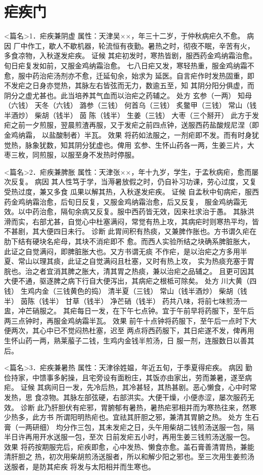 \documentclass[a4paper,12pt,UTF8,twoside]{ctexbook}
\begin{document}
\chapter{疟疾门}
<篇名>1．疟疾兼阴虚
属性：天津吴××，年三十二岁，于仲秋病疟久不愈。 
病因 厂中作工，歇人不歇机器，轮流恒有夜勤。暑热之时，彻夜不眠，辛苦有火，多食凉物，入秋遂发疟疾。 
证候 其疟初发时，寒热皆剧，服西药金鸡纳霜治愈。旬日疟复发如前，又服金鸡纳霜治愈。 
七八日疟又发，寒轻热重，服金鸡纳霜不愈，服中药治疟汤剂亦不愈，迁延旬余，始求为 
延医。自言疟作时发热固重，即不发疟之日身亦觉热，其脉左右皆弦而无力，数逾五至，知 
其阴分阳分俱虚，而阴分之虚尤甚也。此当培养其气血而以治疟之药辅之。 
处方 玄参（一两） 知母（六钱） 天冬（六钱） 潞参（三钱） 
何首乌（三钱） 炙鳖甲（三钱） 常山（钱半酒炒） 柴胡（钱半） 茵 
陈（钱半） 生姜（三钱） 大枣（三个掰开） 
此方于发疟之前一夕煎服，翌晨煎渣再服，又于发疟之前四点钟，送服西药盐酸规尼涅（即金鸡纳霜， 
以盐酸制者）半瓦。 
效果 将药如法服之，一剂疟即不发。而有时身犹觉热，脉象犹数，知其阴分犹虚也。俾用 
玄参、生怀山药各一两，生姜三片，大枣三枚，同煎服，以服至身不发热时停服。 


<篇名>2．疟疾兼脾胀
属性：天津张××，年十九岁，学生，于孟秋病疟，愈而屡次反复。 
病因 其人性笃于学，当溽暑放假之时，仍自补习功课，劳心过度，又复受热过度，兼又多食 
瓜果以解其热，入秋遂发疟疾。 
证候 自孟秋中旬病疟，服西药金鸡纳霜治愈，后旬日反复，又服金鸡纳霜治愈，后又反复， 
服金鸡纳霜无效。以中药治愈，隔旬余病又反复。服中西药皆无效，因来社求治于愚。 
其脉洪滑而实，右部尤甚，自觉心中杜塞满闷，常觉有热上攻，其病疟时则寒热平均，皆不甚剧，其大便四日未行。 
诊断 此胃间积有热痰，又兼脾作胀也。方书谓久疟在肋下结有硬块名疟母，其块不消疟即不 
愈。而西人实验所结之块确系脾脏胀大，此证之自觉满闷，即脾脏胀大也。又方书谓无痰 
不作疟，是以治疟之方多用半夏、常山以理其痰，此证之自觉满闷且杜塞，又时有热上攻， 
实为热痰充塞于胃脘也。治之者宜消其脾之胀大，清其胃之热痰，兼以治疟之品辅之。 
且更可因其大便不通，驱逐脾之病下行自大便泻出，其病疟之根柢可除矣。 
处方 川大黄（四钱） 生鸡内金（三钱黄色的捣） 清半夏（三钱） 常山（钱半酒炒） 
柴胡（钱半） 茵陈（钱半） 甘草（钱半） 净芒硝（钱半） 
药共八味，将前七味煎汤一盅，冲芒硝服之。 
其疟每日一发，在下午七点钟。宜于午前早将药服下，至午后两三点钟时，再服金鸡纳霜半瓦。 
效果 前午十点钟将药服下，至午后一点时下大便两次，其心中已不觉闷热杜塞，迟至 
两点将西药服下，其日疟遂不发，俾再用生怀山药一两，熟莱菔子二钱，生鸡内金钱半煎汤，日 
服一剂，连服数日以善其后。 


<篇名>3．疟疾兼暑热
属性：天津徐姓媪，年近五旬，于季夏得疟疾。 
病因 勤俭持家，中馈事多躬操，且宅旁设有面粉庄，其饭亦由家出，劳而兼暑，遂至病疟。 
证候 其病间日一发，先冷后热，其冷甚轻，其热甚剧。恶心懒食，心中时常发热，思 
食凉物。其脉左部弦硬，右部洪实。大便干燥，小便赤涩，屡次服药无效。 
诊断 此乃肝胆伏有疟邪，胃腑郁有暑热，暑热疟邪相并而为寒热往来，然寒少热多，此方书 
所谓阳明热疟也。宜祛其肝胆之邪，兼清其胃腑之热。 
处方 生石膏（一两研细） 
均分作三包，其未发疟之日，头午用柴胡二钱煎汤送服一包，隔半日许再用开水送服一包，至次 
日前发疟五小时，再用生姜三钱煎汤送服一包。 
效果 将药按期服完后，疟疾即愈，心中发热、懒食亦愈。盖石膏善清胃热，兼能清肝胆之 
热，初次用柴胡煎汤送服者，所以和解少阳之邪也。至三次用生姜煎汤送服者，是防其疟疾 
将发与太阳相并而生寒也。 
\end{document}
